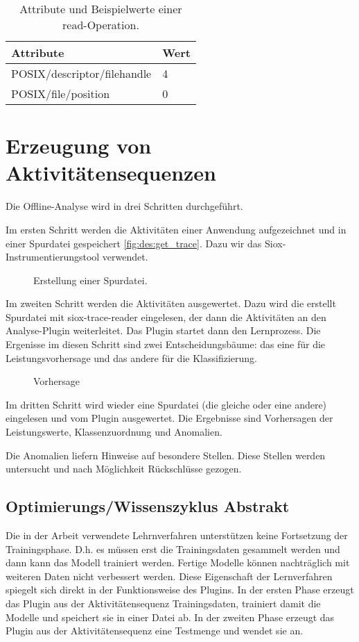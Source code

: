 \begin{table}[h]
	\centering
	\begin{tabular}{l | l}
		Attribute & Wert\\
		\hline
		POSIX/descriptor/filehandle & 4\\
		POSIX/file/position & 0\\
	\end{tabular}
	\caption{Attribute und Beispielwerte einer read-Operation.}
\end{table}



\section{Erzeugung von Aktivitätensequenzen}

Die Offline-Analyse wird in drei Schritten durchgeführt.

Im ersten Schritt werden die Aktivitäten einer Anwendung aufgezeichnet und in einer Spurdatei gespeichert \autoref{fig:des:get_trace}. 
Dazu wir das Siox-Instrumentierungstool verwendet.
\begin{figure}[h]
	\centering
	
	\label{fig:des:get_trace}
	\caption{Erstellung einer Spurdatei.}
\end{figure}

Im zweiten Schritt werden die Aktivitäten ausgewertet. 
Dazu wird die erstellt Spurdatei mit siox-trace-reader eingelesen, der dann die Aktivitäten an den Analyse-Plugin weiterleitet.
Das Plugin startet dann den Lernprozess.
Die Ergenisse im diesen Schritt sind zwei Entscheidungsbäume: das eine für die Leistungsvorhersage und das andere für die Klassifizierung.

\begin{figure}[h]
	\centering
	
	\label{fig:des:results}
	\caption{Vorhersage}
\end{figure}

Im dritten Schritt wird wieder eine Spurdatei (die gleiche oder eine andere) eingelesen und vom Plugin ausgewertet.
Die Ergebnisse sind Vorhersagen der Leistungswerte, Klassenzuordnung und Anomalien.

Die Anomalien liefern Hinweise auf besondere Stellen.
Diese Stellen werden untersucht und nach Möglichkeit Rückschlüsse gezogen.

\subsection{Optimierungs/Wissenszyklus Abstrakt}
Die in der Arbeit verwendete Lehrnverfahren unterstützen keine Fortsetzung der Trainingsphase.
D.h. es müssen erst die Trainingsdaten gesammelt werden und dann kann das Modell trainiert werden.
Fertige Modelle können nachträglich mit weiteren Daten nicht verbessert werden.
Diese Eigenschaft der Lernverfahren spiegelt sich direkt in der Funktionsweise des Plugins. 
In der ersten Phase  erzeugt das Plugin aus der Aktivitätensequenz Trainingsdaten, trainiert damit die Modelle und speichert sie in einer Datei ab.
In der zweiten Phase erzeugt das Plugin aus der Aktivitätensequenz eine Testmenge und wendet sie an.

